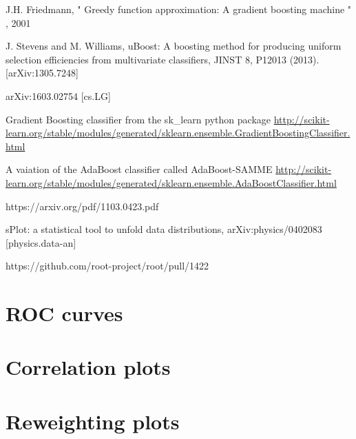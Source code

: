\documentclass[english]{uzhpub}
\begin{document}
\begin{thebibliography}{100}
    J.H. Friedmann, " Greedy function approximation: A gradient boosting machine "  , 2001



     J. Stevens and M. Williams, uBoost: A boosting method for producing uniform selection efficiencies from multivariate classifiers, JINST 8, P12013 (2013). [arXiv:1305.7248]

     arXiv:1603.02754 [cs.LG]

    Gradient Boosting classifier from the sk\_learn python package \url{http://scikit-learn.org/stable/modules/generated/sklearn.ensemble.GradientBoostingClassifier.html}

    A vaiation of the AdaBoost classifier called AdaBoost-SAMME \url{http://scikit-learn.org/stable/modules/generated/sklearn.ensemble.AdaBoostClassifier.html}

    https://arxiv.org/pdf/1103.0423.pdf


    sPlot: a statistical tool to unfold data distributions,
   	arXiv:physics/0402083 [physics.data-an]

     https://github.com/root-project/root/pull/1422



 \end{thebibliography}

 \begin{appendix}
   \section{ROC curves}
   \label{app:roc}
   

   \section{Correlation plots}
   \label{app:corr}
   

   \section{Reweighting plots}
   \label{app:re}
   

 \end{appendix}

 
\end{document}
